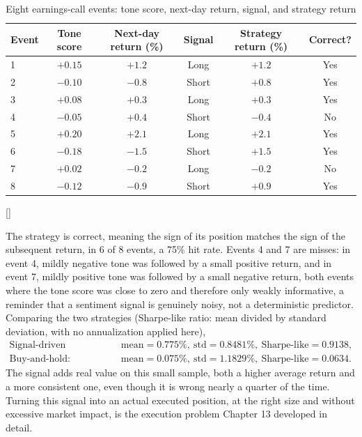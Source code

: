 \documentclass[../ai_in_finance]{subfiles}
\begin{document}
\begin{table}[htbp]
\centering
\begin{lrbox}{\bookmeasuredbox}
\begin{tabular}{lccccc}
\toprule
Event & Tone score & Next-day return (\%) & Signal & Strategy return (\%) & Correct? \\
\midrule
1 & $+0.15$ & $+1.2$ & Long & $+1.2$ & Yes \\
2 & $-0.10$ & $-0.8$ & Short & $+0.8$ & Yes \\
3 & $+0.08$ & $+0.3$ & Long & $+0.3$ & Yes \\
4 & $-0.05$ & $+0.4$ & Short & $-0.4$ & No \\
5 & $+0.20$ & $+2.1$ & Long & $+2.1$ & Yes \\
6 & $-0.18$ & $-1.5$ & Short & $+1.5$ & Yes \\
7 & $+0.02$ & $-0.2$ & Long & $-0.2$ & No \\
8 & $-0.12$ & $-0.9$ & Short & $+0.9$ & Yes \\
\bottomrule
\end{tabular}
\end{lrbox}
\ifdim\wd\bookmeasuredbox<0.65\linewidth
\setlength{\bookcapwidth}{0.65\linewidth}
\else
\setlength{\bookcapwidth}{\wd\bookmeasuredbox}
\fi
{}[\bookcapwidth]{
\usebox{\bookmeasuredbox}
}{
\caption{Eight earnings-call events: tone score, next-day return, signal, and strategy return}
\label{tab:event_driven_signal}
}
\end{table}

The strategy is correct, meaning the sign of its position matches the sign of the subsequent return, in 6 of 8 events, a 75\% hit rate. Events 4 and 7 are misses: in event 4, mildly negative tone was followed by a small positive return, and in event 7, mildly positive tone was followed by a small negative return, both events where the tone score was close to zero and therefore only weakly informative, a reminder that a sentiment signal is genuinely noisy, not a deterministic predictor. Comparing the two strategies (Sharpe-like ratio: mean divided by standard deviation, with no annualization applied here),
\begin{align*}
\text{Signal-driven strategy:} &\quad \text{mean} = 0.775\%, \ \text{std} = 0.8481\%, \ \text{Sharpe-like} = 0.9138, \\
\text{Buy-and-hold:} &\quad \text{mean} = 0.075\%, \ \text{std} = 1.1829\%, \ \text{Sharpe-like} = 0.0634.
\end{align*} The signal adds real value on this small sample, both a higher average return and a more consistent one, even though it is wrong nearly a quarter of the time. Turning this signal into an actual executed position, at the right size and without excessive market impact, is the execution problem Chapter 13 developed in detail.
\end{document}
